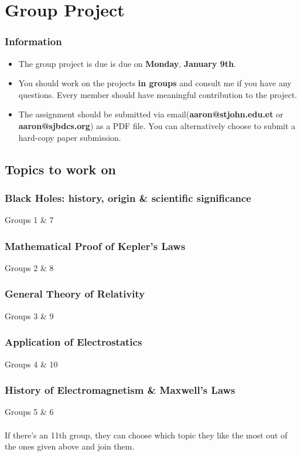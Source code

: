 \documentclass[9pt,addpoints]{exam}
\begin{document}
	\section*{Group Project}
	\begin{center}
		\subsubsection*{Information}
		\begin{itemize}
			\item The group project is due is due on \textbf{Monday}, \textbf{January 9th}.
			\item You should work on the projects \textbf{in groups} and consult me if you have any questions. Every member should have meaningful contribution to the project.
			\item The assignment should be submitted via email(\textbf{aaron@stjohn.edu.et} or \textbf{aaron@sjbdcs.org}) as a PDF file. You can alternatively choose to submit a hard-copy paper submission.
		\end{itemize}
	\end{center}
	\begin{center}
		\subsection*{Topics to work on}
	\end{center}
	\subsubsection*{Black Holes: history, origin \& scientific significance} 
	Groups 1 \& 7
	\subsubsection*{Mathematical Proof of Kepler's Laws}
	Groups 2 \& 8
	\subsubsection*{General Theory of Relativity}
	Groups 3 \& 9
	\subsubsection*{Application of Electrostatics}
	Groups 4 \& 10
	\subsubsection*{History of Electromagnetism \& Maxwell's Laws} 
	Groups 5 \& 6 \\ \\ 
	If there's an 11th group, they can choose which topic they like the most out of the ones given above and join them.		
\end{document}
